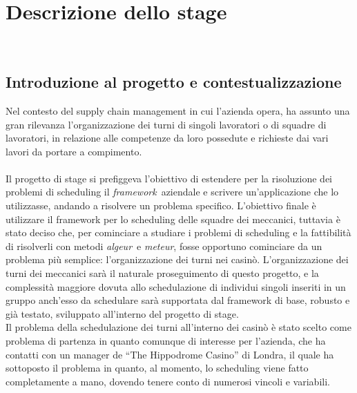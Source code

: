 
\renewcommand\theadalign{cb}
\renewcommand\theadfont{\bfseries}
\renewcommand\theadgape{\Gape[4pt]}
\renewcommand{\arraystretch}{2}

\chapter{Descrizione dello stage}
\label{cap:descrizione-stage}

\\

\section{Introduzione al progetto e contestualizzazione}
Nel contesto del supply chain management in cui l’azienda opera, ha assunto una gran rilevanza l’organizzazione dei turni di singoli lavoratori o di squadre di lavoratori, in relazione alle competenze da loro possedute e richieste dai vari lavori da portare a compimento. \\ \\
Il progetto di stage si prefiggeva l'obiettivo di estendere per la risoluzione dei problemi di scheduling il \emph{\gls{framework}}\glsfirstoccur\ aziendale e scrivere un'applicazione che lo utilizzasse, andando a risolvere un problema specifico. L'obiettivo finale è utilizzare il framework per lo scheduling delle squadre dei meccanici, tuttavia è stato deciso che, per cominciare a studiare i problemi di scheduling e la fattibilità di risolverli con metodi \emph{\gls{algeur}}\glsfirstoccur\ e \emph{\gls{meteur}}\glsfirstoccur, fosse opportuno cominciare da un problema più semplice: l'organizzazione dei turni nei casinò. L'organizzazione dei turni dei meccanici sarà il naturale proseguimento di questo progetto, e la complessità maggiore dovuta allo schedulazione di individui singoli inseriti in un gruppo anch'esso da schedulare sarà supportata dal framework di base, robusto e già testato, sviluppato all'interno del progetto di stage. \\ 
Il problema della schedulazione dei turni all'interno dei casinò è stato scelto come problema di partenza in quanto comunque di interesse per l'azienda, che ha contatti con un manager de ``The Hippodrome Casino'' di Londra, il quale ha sottoposto il problema in quanto, al momento, lo scheduling viene fatto completamente a mano, dovendo tenere conto di numerosi vincoli e variabili. \\

